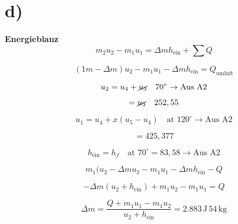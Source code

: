 

\section*{d)}

\textbf{Energieblanz}
\begin{equation*}
m_2 u_2 - m_1 u_1 = \Delta m h_{\text{ein}} + \sum Q
\end{equation*}

\begin{equation*}
(1m - \Delta m) u_2 - m_1 u_1 - \Delta m h_{\text{ein}} = Q_{\text{umluft}}
\end{equation*}

\begin{equation*}
u_2 = u_4 + \cancel{u_3} \quad 70^\circ \rightarrow \text{Aus A2}
\end{equation*}

\begin{equation*}
= \cancel{u_3} \quad 252,55
\end{equation*}

\begin{equation*}
u_1 = u_4 + x (u_5 - u_4) \quad \text{at } 120^\circ \rightarrow \text{Aus A2}
\end{equation*}

\begin{equation*}
= 425,377
\end{equation*}

\begin{equation*}
h_{\text{ein}} = h_f \quad \text{at } 70^\circ = 83,58 \rightarrow \text{Aus A2}
\end{equation*}

\begin{equation*}
m_1 (u_2 - \Delta m u_2 - m_1 u_1 - \Delta m h_{\text{ein}} - Q
\end{equation*}

\begin{equation*}
- \Delta m (u_2 + h_{\text{ein}}) + m_1 u_2 - m_1 u_1 = Q
\end{equation*}

\begin{equation*}
\Delta m = \frac{Q + m_1 u_1 - m_1 u_2}{u_2 + h_{\text{ein}}} = 2.883 \, \text{J} \, 54 \, \text{kg}
\end{equation*}